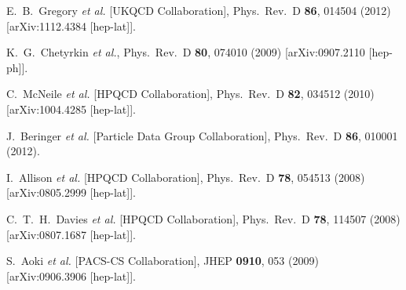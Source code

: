 \begin{thebibliography}{99}
  E.~B.~Gregory {\it et al.}  [UKQCD Collaboration],
  Phys.\ Rev.\ D {\bf 86}, 014504 (2012)
  [arXiv:1112.4384 [hep-lat]].

  K.~G.~Chetyrkin {\it et al.},
  Phys.\ Rev.\ D {\bf 80}, 074010 (2009)
  [arXiv:0907.2110 [hep-ph]].

  C.~McNeile {\it et al.} [HPQCD Collaboration],
  Phys.\ Rev.\ D {\bf 82}, 034512 (2010)
  [arXiv:1004.4285 [hep-lat]].
  
  J.~Beringer {\it et al.}  [Particle Data Group Collaboration],
  Phys.\ Rev.\ D {\bf 86}, 010001 (2012).
  
  I.~Allison {\it et al.}  [HPQCD Collaboration],
  Phys.\ Rev.\ D {\bf 78}, 054513 (2008)
  [arXiv:0805.2999 [hep-lat]].
  
  C.~T.~H.~Davies {\it et al.}  [HPQCD Collaboration],
  Phys.\ Rev.\ D {\bf 78}, 114507 (2008)
  [arXiv:0807.1687 [hep-lat]].
  
  S.~Aoki {\it et al.}  [PACS-CS Collaboration],
  JHEP {\bf 0910}, 053 (2009)
  [arXiv:0906.3906 [hep-lat]].
  

\end{thebibliography}
